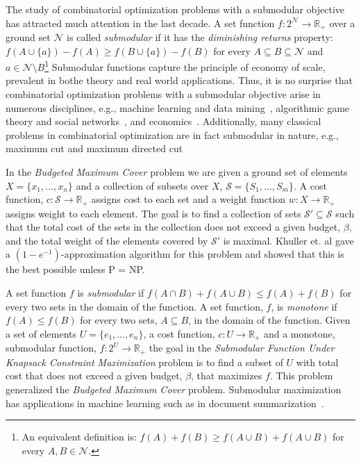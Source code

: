 The study of combinatorial optimization problems with a submodular objective has attracted much attention in the last decade. 
A set function $f:2^\mathcal{N} \to \mathbb{R}_+$ over a ground set $\mathcal{N}$ is called \emph{submodular} if it has the \emph{diminishing returns} property:
$f(A \cup \{a\}) - f(A) \geq f(B \cup \{a\}) - f(B)$ for every $A \subseteq B \subseteq \mathcal{N}$ and $a \in \mathcal{N} \setminus B$\footnote{
    An equivalent definition is: $f(A) + f(B) \geq f(A \cup B) + f(A \cup B)$ for every $A,B \in \mathcal{N}$.
}
Submodular functions capture the principle of economy of scale, prevalent in bothe theory and real world applications.
Thus, it is no surprise that combinatorial optimization problems with a submodular objective arise in numerous disciplines, e.g., machine learning and data mining~\cite{bach2013learning,bordeaux2014tractability}, algorithmic game theory and social networks~\cite{dughmi2009revenue,hartline2008optimal,he2015stability,kempe2003maximizing,schulz2013approximating}, and economics~\cite{ahmed2011maximizing}.
Additionally, many classical problems in combinatorial optimization are in fact submodular in nature, e.g., maximum cut and maximum directed cut~\cite{goemans1995improved,}


In the \emph{Budgeted Maximum Cover} problem we are given a ground set of elements
$X = \{x_1, \dots, x_n\}$ and a collection of subsets over $X$,
$\mathcal{S} = \{S_1, \dots, S_m\}$.
A cost function, $c:\mathcal{S} \to \mathbb{R}_+$ assigns cost to each set
and a weight function $w:X \to \mathbb{R}_+$ assigns weight to each element.
The goal is to find a collection of sets $\mathcal{S'} \subseteq \mathcal{S}$ 
such that the total cost of the sets in the collection does not exceed a given budget, 
$\beta$, and the
total weight of the elements covered by $\mathcal{S'}$ is maximal.
Khuller et. al \cite{khuller1999budgeted}
gave a $(1-e^{-1})$-approximation algorithm for this problem and showed that this
is the best possible unless P = NP.

A set function $f$ is \emph{submodular} if $f(A \cap B) + f(A \cup B) \leq f(A) + f(B)$
for every two sets in the domain of the function. A set function, $f$, 
is \emph{monotone} if
$f(A) \leq f(B)$ for every two sets, $A \subseteq B$, in the domain of the function.
Given a set of elements $U = \{e_1, \dots, e_n\}$, a cost function,
$c:U \to \mathbb{R}_+$ and a monotone, submodular function, $f:2^U \to \mathbb{R}_+$
the goal in the 
\emph{Submodular Function Under Knapsack Constraint Maximization} 
problem is to find a subset of $U$ with total cost that does not exceed
a given budget, $\beta$, that maximizes $f$.
This problem generalized the \emph{Budgeted Maximum Cover} problem.
Submodular maximization has applications in machine learning such as in document summarization~\cite{lin2010multi}.

